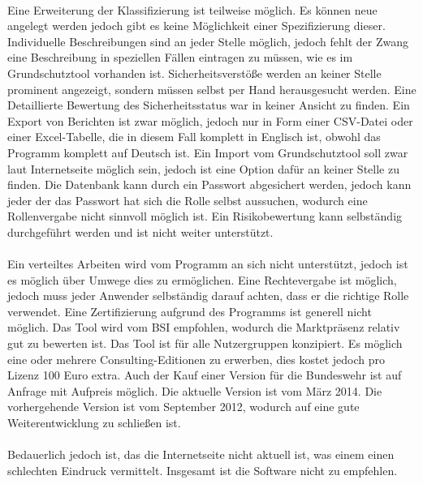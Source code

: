 \\
Eine Erweiterung der Klassifizierung ist teilweise möglich. Es können neue angelegt werden jedoch gibt es keine Möglichkeit einer Spezifizierung dieser. Individuelle Beschreibungen sind an jeder Stelle möglich, jedoch fehlt der Zwang eine Beschreibung in speziellen Fällen eintragen zu müssen, wie es im Grundschutztool vorhanden ist. Sicherheitsverstöße werden an keiner Stelle prominent angezeigt, sondern müssen selbst per Hand herausgesucht werden. Eine Detaillierte Bewertung des Sicherheitsstatus war in keiner Ansicht zu finden. Ein Export von Berichten ist zwar möglich, jedoch nur in Form einer CSV-Datei oder einer Excel-Tabelle, die in diesem Fall komplett in Englisch ist, obwohl das Programm komplett auf Deutsch ist. Ein Import vom Grundschutztool soll zwar laut Internetseite möglich sein, jedoch ist eine Option dafür an keiner Stelle zu finden. Die Datenbank kann durch ein Passwort abgesichert werden, jedoch kann jeder der das Passwort hat sich die Rolle selbst aussuchen, wodurch eine Rollenvergabe nicht sinnvoll möglich ist. Ein Risikobewertung kann selbständig durchgeführt werden und ist nicht weiter unterstützt.\\
\\
Ein verteiltes Arbeiten wird vom Programm an sich nicht unterstützt, jedoch ist es möglich über Umwege dies zu ermöglichen. Eine Rechtevergabe ist möglich, jedoch muss jeder Anwender selbständig darauf achten, dass er die richtige Rolle verwendet. Eine Zertifizierung aufgrund des Programms ist generell nicht möglich. Das Tool wird vom BSI empfohlen, wodurch die Marktpräsenz relativ gut zu bewerten ist. Das Tool ist für alle Nutzergruppen konzipiert. Es möglich eine oder mehrere Consulting-Editionen zu erwerben, dies kostet jedoch pro Lizenz 100 Euro extra. Auch der Kauf einer Version für die Bundeswehr ist auf Anfrage mit Aufpreis möglich. Die aktuelle Version ist vom März 2014. Die vorhergehende Version ist vom September 2012, wodurch auf eine gute Weiterentwicklung zu schließen ist.\\
\\
Bedauerlich jedoch ist, das die Internetseite nicht aktuell ist, was einem einen schlechten Eindruck vermittelt. Insgesamt ist die Software nicht zu empfehlen.